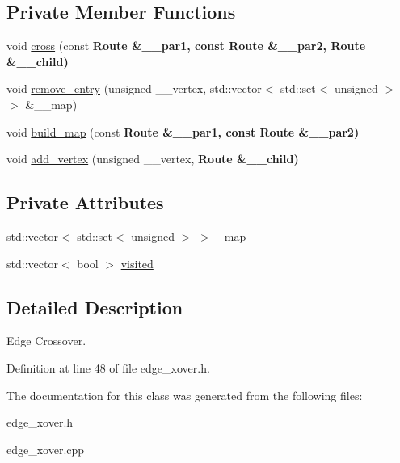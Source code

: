 \subsection*{Private Member Functions}
\begin{CompactItemize}
\item 
\hypertarget{classEdgeXover_88c2d4c9a878454a32d56010f3dddc27}{
void \hyperlink{classEdgeXover_88c2d4c9a878454a32d56010f3dddc27}{cross} (const \bf{Route} \&\_\-\_\-par1, const \bf{Route} \&\_\-\_\-par2, \bf{Route} \&\_\-\_\-child)}
\label{classEdgeXover_88c2d4c9a878454a32d56010f3dddc27}

\item 
\hypertarget{classEdgeXover_1b3a4c75dd9a034c81af6d89d85d30f5}{
void \hyperlink{classEdgeXover_1b3a4c75dd9a034c81af6d89d85d30f5}{remove\_\-entry} (unsigned \_\-\_\-vertex, std::vector$<$ std::set$<$ unsigned $>$ $>$ \&\_\-\_\-map)}
\label{classEdgeXover_1b3a4c75dd9a034c81af6d89d85d30f5}

\item 
\hypertarget{classEdgeXover_04de96aa1016836e0ba5f4b952a5fa16}{
void \hyperlink{classEdgeXover_04de96aa1016836e0ba5f4b952a5fa16}{build\_\-map} (const \bf{Route} \&\_\-\_\-par1, const \bf{Route} \&\_\-\_\-par2)}
\label{classEdgeXover_04de96aa1016836e0ba5f4b952a5fa16}

\item 
\hypertarget{classEdgeXover_2d3045ef503d8b16a27e11fdc23ca11c}{
void \hyperlink{classEdgeXover_2d3045ef503d8b16a27e11fdc23ca11c}{add\_\-vertex} (unsigned \_\-\_\-vertex, \bf{Route} \&\_\-\_\-child)}
\label{classEdgeXover_2d3045ef503d8b16a27e11fdc23ca11c}

\end{CompactItemize}
\subsection*{Private Attributes}
\begin{CompactItemize}
\item 
\hypertarget{classEdgeXover_d41399c6effb54ee48c722f1e19cb3c3}{
std::vector$<$ std::set$<$ unsigned $>$ $>$ \hyperlink{classEdgeXover_d41399c6effb54ee48c722f1e19cb3c3}{\_\-map}}
\label{classEdgeXover_d41399c6effb54ee48c722f1e19cb3c3}

\item 
\hypertarget{classEdgeXover_46d4d4724cf6d660b1a7ab4a346573d4}{
std::vector$<$ bool $>$ \hyperlink{classEdgeXover_46d4d4724cf6d660b1a7ab4a346573d4}{visited}}
\label{classEdgeXover_46d4d4724cf6d660b1a7ab4a346573d4}

\end{CompactItemize}


\subsection{Detailed Description}
Edge Crossover. 



Definition at line 48 of file edge\_\-xover.h.

The documentation for this class was generated from the following files:\begin{CompactItemize}
\item 
edge\_\-xover.h\item 
edge\_\-xover.cpp\end{CompactItemize}
